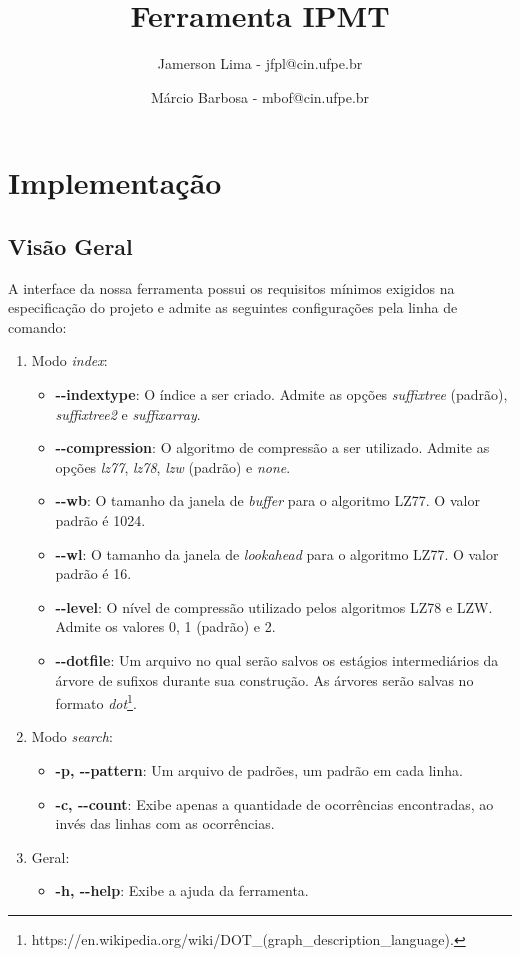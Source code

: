 \documentclass[]{article}
\title{Ferramenta IPMT}
\author{Jamerson Lima - jfpl@cin.ufpe.br \and Márcio Barbosa - mbof@cin.ufpe.br}
\date{}
\begin{document}
\maketitle

\section{Implementação}

\subsection{Visão Geral}

A interface da nossa ferramenta possui os requisitos mínimos exigidos na especificação do projeto e admite as seguintes configurações pela linha de comando:
\begin{enumerate}
	\item Modo \textit{index}:
		\begin{itemize}
			\item \textbf{-{}-indextype}: O índice a ser criado. Admite as opções \textit{suffixtree} (padrão), \textit{suffixtree2} e \textit{suffixarray}. 
			\item \textbf{-{}-compression}: O algoritmo de compressão a ser utilizado. Admite as opções \textit{lz77}, \textit{lz78}, \textit{lzw} (padrão) e \textit{none}.
			\item \textbf{-{}-wb}: O tamanho da janela de \textit{buffer} para o algoritmo LZ77. O valor padrão é 1024.
			\item \textbf{-{}-wl}: O tamanho da janela de \textit{lookahead} para o algoritmo LZ77. O valor padrão é 16.
			\item \textbf{-{}-level}: O nível de compressão utilizado pelos algoritmos LZ78 e LZW. Admite os valores 0, 1 (padrão) e 2.
			\item \textbf{-{}-dotfile}: Um arquivo no qual serão salvos os estágios intermediários da árvore de sufixos durante sua construção. As árvores serão salvas no formato \textit{dot}\footnote{https://en.wikipedia.org/wiki/DOT\_(graph\_description\_language).}.
		\end{itemize}

	\item Modo \textit{search}:
		\begin{itemize}
			\item \textbf{-p, -{}-pattern}: Um arquivo de padrões, um padrão em cada linha.
			\item \textbf{-c, -{}-count}: Exibe apenas a quantidade de ocorrências encontradas, ao invés das linhas com as ocorrências.
		\end{itemize}
	
	\item Geral:
		\begin{itemize}
			\item \textbf{-h, -{}-help}: Exibe a ajuda da ferramenta.
		\end{itemize}
			
\end{enumerate}
\end{document}
